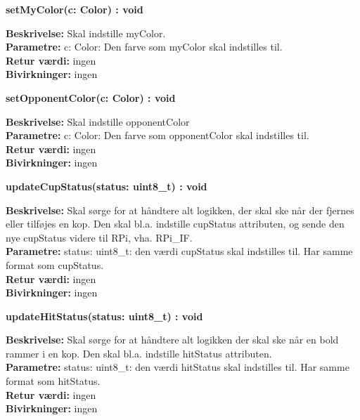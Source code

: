\documentclass[Arkitektur/System_main.tex]{subfiles}
\begin{document}
\textbf{setMyColor(c: Color) : void}
\begin{adjustwidth}{1cm}{0pt}
\textbf{Beskrivelse:} Skal indstille myColor. \\[0.2cm]
\textbf{Parametre:} c: Color: Den farve som myColor skal indstilles til. \\[0.2cm]
\textbf{Retur værdi:} ingen \\[0.2cm]
\textbf{Bivirkninger:} ingen \\[0.2cm]
\end{adjustwidth}

\textbf{setOpponentColor(c: Color) : void}
\begin{adjustwidth}{1cm}{0pt}
\textbf{Beskrivelse:} Skal indstille opponentColor \\[0.2cm]
\textbf{Parametre:} c: Color: Den farve som opponentColor skal indstilles til.\\[0.2cm]
\textbf{Retur værdi:} ingen\\[0.2cm]
\textbf{Bivirkninger:} ingen\\[0.2cm]
\end{adjustwidth}

\textbf{updateCupStatus(status: uint8\_t) : void}
\begin{adjustwidth}{1cm}{0pt}
\textbf{Beskrivelse:} Skal sørge for at håndtere alt logikken, der skal ske når der fjernes eller tilføjes en kop. Den skal bl.a. indstille cupStatus attributen, og sende den nye cupStatus videre til RPi, vha. RPi\_IF.\\[0.2cm]
\textbf{Parametre:} status: uint8\_t: den værdi cupStatus skal indstilles til. Har samme format som cupStatus.\\[0.2cm]
\textbf{Retur værdi:} ingen\\[0.2cm]
\textbf{Bivirkninger:} ingen\\[0.2cm]
\end{adjustwidth}

\textbf{updateHitStatus(status: uint8\_t) : void}
\begin{adjustwidth}{1cm}{0pt}
\textbf{Beskrivelse:} Skal sørge for at håndtere alt logikken der skal ske når en bold rammer i en kop. Den skal bl.a. indstille hitStatus attributen.\\[0.2cm]
\textbf{Parametre:} status: uint8\_t: den værdi hitStatus skal indstilles til. Har samme format som hitStatus.\\[0.2cm]
\textbf{Retur værdi:} ingen\\[0.2cm]
\textbf{Bivirkninger:} ingen\\[0.2cm]
\end{adjustwidth}
\end{document}
